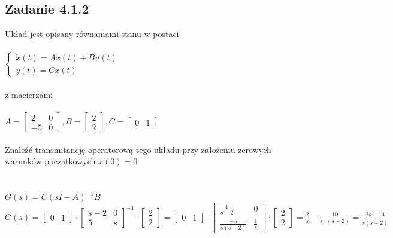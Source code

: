 \pagebreak
\subsection*{Zadanie 4.1.2} {\color{darkgray}
	Układ jest opisany równaniami stanu w postaci\\\\
	$\begin{cases} \dot{x}(t)=Ax(t)+Bu(t)\\y(t)=Cx(t)\end{cases}$\\\\
	z macierzami\\\\
	$A=\left[\begin{array}{cc}2&0\\-5&0\end{array}\right],
	B=\left[\begin{array}{c}2\\2\end{array}\right],
	C=\left[\begin{array}{cc}0&1\end{array}\right]$\\\\
	Znaleźć transmitancję operatorową tego układu przy założeniu zerowych warunków początkowych $x(0)=0$\\
}\lineh
\\\\
$G(s)=C(sI-A)^{-1}B$\\
$G(s)=\left[\begin{array}{cc}0&1\end{array}\right]
\cdot
\left[\begin{array}{cc}{s-2}&0\\5&s\end{array}\right]^{-1}
\cdot
\left[\begin{array}{c}2\\2\end{array}\right]=\left[\begin{array}{cc}0&1\end{array}\right]
\cdot 
\left[\begin{array}{cc}{\frac{1}{s-2}}&0\\\frac{-5}{s(s-2)}&\frac{1}{s}\end{array}\right]
\cdot
\left[\begin{array}{c}2\\2\end{array}\right]=\frac{2}{s}-\frac{10}{s\cdot(s-2)}=\frac{2s-14}{s\dot{(s-2)}}
$

